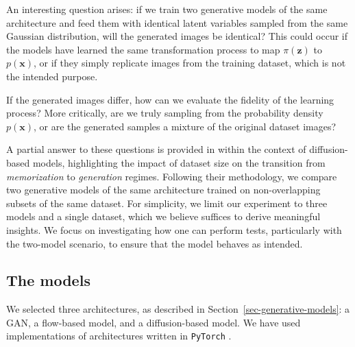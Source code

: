 \documentclass[fleqn,usenatbib]{mnras}
\begin{document}
An interesting question arises: if we train two generative models of the same architecture and feed them with identical latent variables sampled from the same Gaussian distribution, will the generated images be identical? This could occur if the models have learned the same transformation process to map $\pi(\bm{z})$ to $p(\bm{x})$, or if they simply replicate images from the training dataset, which is not the intended purpose. 

If the generated images differ, how can we evaluate the fidelity of the learning process? More critically, are we truly sampling from the probability density $p(\bm{x})$, or are the generated samples a mixture of the original dataset images?

A partial answer to these questions is provided in \cite{kadkhodaie2024generalization} within the context of diffusion-based models, highlighting the impact of dataset size on the transition from \textit{memorization} to \textit{generation} regimes. Following their methodology, we compare two generative models of the same architecture trained on non-overlapping subsets of the same dataset. For simplicity, we limit our experiment to three models and a single dataset, which we believe suffices to derive meaningful insights. 
{\color{red}We focus on investigating how one can perform tests, particularly with the two-model scenario, to ensure that the model behaves as intended. 
}

%

%
\subsection{The models}
\label{sec-Exp-Models}
%
We selected three architectures, as described in Section~\ref{sec-generative-models}: a GAN, a flow-based model, and a diffusion-based model. We have used implementations of architectures written in \texttt{PyTorch} \citep{PyTorch2019}. 
\end{document}
